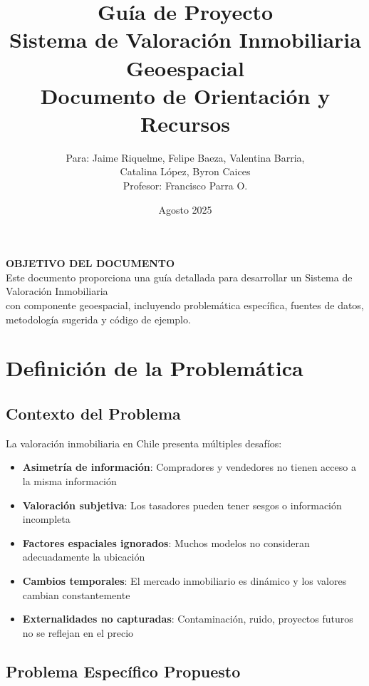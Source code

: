 \documentclass[11pt,a4paper]{article}
\title{{\Huge \textbf{Guía de Proyecto}}\\[0.5cm]
{\Large Sistema de Valoración Inmobiliaria Geoespacial}\\[0.3cm]
{\large Documento de Orientación y Recursos}}
\author{Para: Jaime Riquelme, Felipe Baeza, Valentina Barria,\\
Catalina López, Byron Caices\\[0.3cm]
Profesor: Francisco Parra O.}
\date{Agosto 2025}
\begin{document}
\maketitle
\thispagestyle{empty}

\begin{tcolorbox}[colframe=usachblue,colback=blue!5]
\centering
\textbf{OBJETIVO DEL DOCUMENTO}\\[0.3cm]
Este documento proporciona una guía detallada para desarrollar un Sistema de Valoración Inmobiliaria\\
con componente geoespacial, incluyendo problemática específica, fuentes de datos,\\
metodología sugerida y código de ejemplo.
\end{tcolorbox}

\newpage

\tableofcontents
\newpage

\section{Definición de la Problemática}

\subsection{Contexto del Problema}

La valoración inmobiliaria en Chile presenta múltiples desafíos:

\begin{itemize}
    \item \textbf{Asimetría de información}: Compradores y vendedores no tienen acceso a la misma información
    \item \textbf{Valoración subjetiva}: Los tasadores pueden tener sesgos o información incompleta
    \item \textbf{Factores espaciales ignorados}: Muchos modelos no consideran adecuadamente la ubicación
    \item \textbf{Cambios temporales}: El mercado inmobiliario es dinámico y los valores cambian constantemente
    \item \textbf{Externalidades no capturadas}: Contaminación, ruido, proyectos futuros no se reflejan en el precio
\end{itemize}

\subsection{Problema Específico Propuesto}
\end{document}
